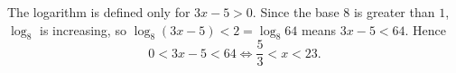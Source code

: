 The logarithm is defined only for $3x-5>0$. Since the base $8$ is greater than $1$, $\log_8$ is increasing, so $\log_8(3x-5)<2=\log_8 64$ means $3x-5<64$. Hence
\[0<3x-5<64\iff \boxed{\dfrac{5}{3}<x<23}.\]
